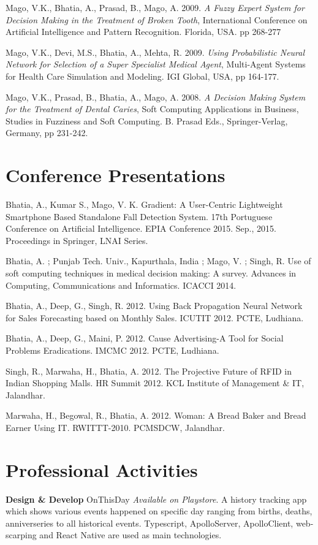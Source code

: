 \documentclass[margin,line]{res}
\begin{document}
\begin{resume}
Mago, V.K., Bhatia, A., Prasad,  B., Mago, A. 2009. \emph{A Fuzzy Expert System for Decision Making in the Treatment of Broken Tooth}, International Conference on Artificial Intelligence and Pattern Recognition. Florida, USA. pp 268-277

Mago, V.K., Devi, M.S., Bhatia, A., Mehta, R. 2009. \emph{Using Probabilistic Neural Network for Selection of a Super Specialist Medical Agent}, Multi-Agent Systems for Health Care Simulation and Modeling. IGI Global, USA, pp 164-177.

Mago, V.K., Prasad, B., Bhatia, A., Mago, A. 2008. \emph{A Decision Making System for the Treatment of Dental Caries}, Soft Computing Applications in Business, Studies in Fuzziness and Soft Computing. B. Prasad Eds., Springer-Verlag, Germany, pp 231-242.

\section{\sc Conference Presentations}
Bhatia, A., Kumar S., Mago, V. K. Gradient: A User-Centric Lightweight Smartphone Based Standalone Fall Detection System. 17th Portuguese Conference on Artificial Intelligence. EPIA Conference 2015. Sep., 2015. Proceedings in Springer, LNAI Series.

Bhatia, A. ; Punjab Tech. Univ., Kapurthala, India ; Mago, V. ; Singh, R. Use of soft computing techniques in medical decision making: A survey. Advances in Computing, Communications and Informatics. ICACCI 2014.  

Bhatia, A., Deep, G., Singh, R. 2012. Using Back Propagation Neural Network for Sales Forecasting based on Monthly Sales. ICUTIT 2012. PCTE, Ludhiana.

Bhatia, A., Deep, G., Maini, P. 2012. Cause Advertising-A Tool for Social Problems Eradications. IMCMC 2012. PCTE, Ludhiana.

Singh, R., Marwaha, H., Bhatia, A. 2012. The Projective Future of RFID in Indian Shopping Malls. HR Summit 2012. KCL Institute of Management \& IT, Jalandhar. 

Marwaha, H., Begowal, R., Bhatia, A. 2012. Woman: A Bread Baker and Bread Earner Using IT. RWITTT-2010. PCMSDCW, Jalandhar.

\section{\sc Professional Activities}

\textbf{Design \& Develop} OnThisDay {\em Available on Playstore}. A history tracking app which shows various events happened on specific day ranging from births, deaths, anniverseries to all historical events. Typescript, ApolloServer, ApolloClient, web-scarping and React Native are used as main technologies.\\  


\end{resume}
\end{document}
